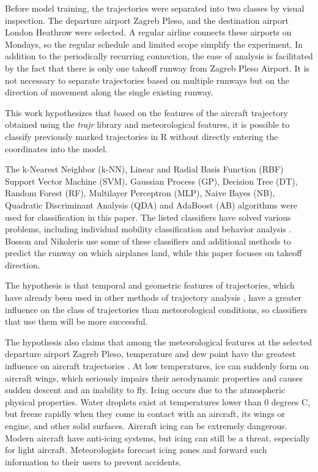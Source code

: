 \let\LaTeXcline\cline\documentclass[sn-mathphys-num]{sn-jnl}\let\cline\LaTeXcline
\begin{document}
Before model training, the trajectories were separated into two classes by visual inspection. The departure airport Zagreb Pleso, and the destination airport London Heathrow were selected. A regular airline connects these airports on Mondays, so the regular schedule and limited scope simplify the experiment. In addition to the periodically recurring connection, the ease of analysis is facilitated by the fact that there is only one takeoff runway from Zagreb Pleso Airport. It is not necessary to separate trajectories based on multiple runways but on the direction of movement along the single existing runway.

This work hypothesizes that based on the features of the aircraft trajectory obtained using the \textit{trajr} library and meteorological features, it is possible to classify previously marked trajectories in R without directly entering the coordinates into the model.

The k-Nearest Neighbor (k-NN), Linear and Radial Basis Function (RBF) Support Vector Machine (SVM), Gaussian Process (GP), Decision Tree (DT), Random Forest (RF), Multilayer Perceptron (MLP), Naive Bayes (NB), Quadratic Discriminant Analysis (QDA) and AdaBoost (AB) algorithms were used for classification in this paper. The listed classifiers have solved various problems, including individual mobility classification \cite{csl-202004-0019} and behavior analysis \cite{Garcia_Ceja2021-tw}. Bosson and Nikoleris \cite{Bosson2018} use some of these classifiers and additional methods to predict the runway on which airplanes land, while this paper focuses on takeoff direction.

The hypothesis is that temporal and geometric features of trajectories, which have already been used in other methods of trajectory analysis \cite{dumenvcic2022trajectory, Makar2022}, have a greater influence on the class of trajectories than meteorological conditions, so classifiers that use them will be more successful.
 
The hypothesis also claims that among the meteorological features at the selected departure airport Zagreb Pleso, temperature and dew point have the greatest influence on aircraft trajectories \cite{Gultepe2019}. At low temperatures, ice can suddenly form on aircraft wings, which seriously impairs their aerodynamic properties and causes sudden descent and an inability to fly. Icing occurs due to the atmospheric physical properties. Water droplets exist at temperatures lower than $0$ degrees $\mathrm{C}$, but freeze rapidly when they come in contact with an aircraft, its wings or engine, and other solid surfaces. Aircraft icing can be extremely dangerous. Modern aircraft have anti-icing systems, but icing can still be a threat, especially for light aircraft. Meteorologists forecast icing zones and forward such information to their users to prevent accidents.
\end{document}
